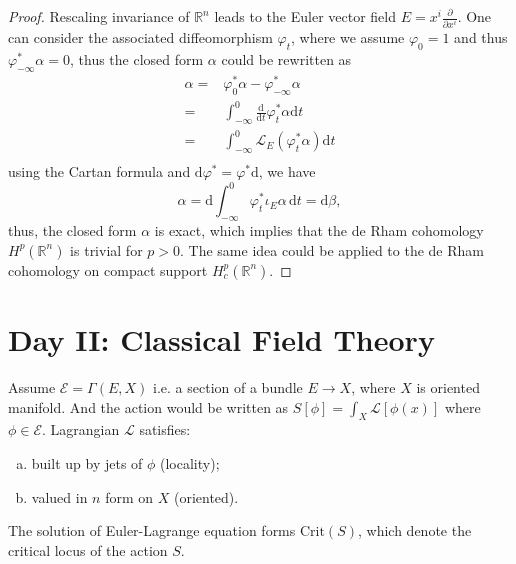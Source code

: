 \documentclass[10pt]{article}
\begin{document}
\begin{proof}
  Rescaling invariance of $ \mathbb{R}^{n}$ leads to the Euler vector field $ E = x^{i} \frac{\partial }{\partial x^{i}}$. One can consider the associated diffeomorphism $ \varphi_{t}$, where we assume $ \varphi_{0} = 1$ and thus $ \varphi^{*}_{-\infty } \alpha = 0$, thus the closed form $ \alpha$ could be rewritten as
  \begin{equation*}
    \begin{aligned}
      \alpha = & \varphi^*_{0} \alpha - \varphi^*_{-\infty } \alpha \\
      = & \int_{-\infty }^{0} \frac{\mathrm{d} }{\mathrm{d} t} \varphi_{t}^{*} \alpha \mathrm{d} t \\
      = & \int_{-\infty }^{0} \mathcal{L}_{E} (\varphi^{*}_{t} \alpha )\mathrm{d} t \\
    \end{aligned}
  \end{equation*}
  using the Cartan formula and $ \mathrm{d} \varphi^{*} = \varphi^{*} \mathrm{d} $, we have
  \begin{equation*}
    \alpha = \mathrm{d} \int_{-\infty }^{0} \varphi^{*}_{t} \iota_{E} \alpha \, \mathrm{d} t = \mathrm{d} \beta,
  \end{equation*}
  thus, the closed form $ \alpha$ is exact, which implies that the de Rham cohomology $ H^{p}(\mathbb{R}^{n})$ is trivial for $ p>0$. The same idea could be applied to the de Rham cohomology on compact support $ H^{p}_{c}(\mathbb{R}^{n})$.
\end{proof}

\section{Day II: Classical Field Theory}

Assume $ \mathcal{E} = \Gamma(E,X)$ i.e. a section of a bundle $ E \rightarrow X$, where $ X$ is oriented manifold.
And the action would be written as $ S[\phi] = \int _{X} \mathcal{L}[\phi(x)]$ where $ \phi \in \mathcal{E}$.
Lagrangian $ \mathcal{L}$ satisfies:
\begin{enumerate}[(a)]
  \item built up by jets of $ \phi$ (locality);
  \item valued in $ n$ form on $ X$ (oriented).
\end{enumerate}
The solution of Euler-Lagrange equation forms $ \mathrm{Crit}(S)$, which denote the critical locus of the action $S$.
\end{document}

